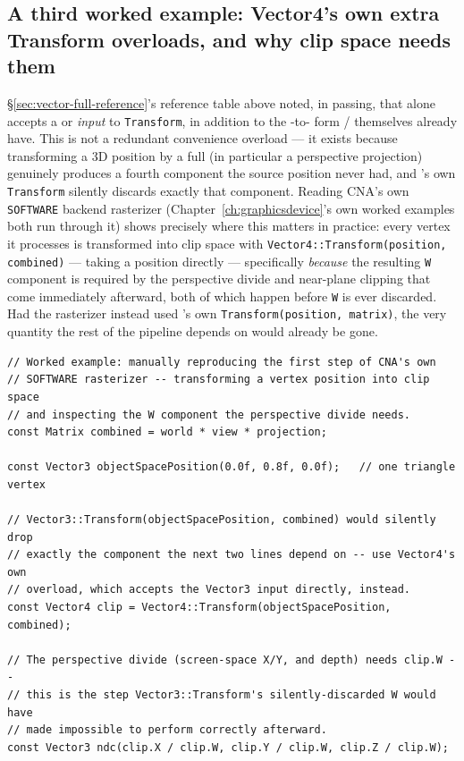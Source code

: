 \subsection{A third worked example: Vector4's own extra Transform overloads, and why clip space needs them}

\S\ref{sec:vector-full-reference}'s reference table above noted, in passing, that
 alone accepts a  or  \emph{input} to
\texttt{Transform}, in addition to the -to- form
 /  themselves already have. This is not a redundant
convenience overload --- it exists because transforming a 3D position by a full
 (in particular a perspective projection) genuinely produces a fourth
component the source position never had, and 's own \texttt{Transform}
silently discards exactly that component. Reading CNA's own \texttt{SOFTWARE} backend
rasterizer (Chapter~\ref{ch:graphicsdevice}'s own worked examples both run through it) shows
precisely where this matters in practice: every vertex it processes is transformed into clip
space with \texttt{Vector4::Transform(position, combined)} --- taking a 
position directly --- specifically \emph{because} the resulting \texttt{W} component is
required by the perspective divide and near-plane clipping that come immediately afterward,
both of which happen before \texttt{W} is ever discarded. Had the rasterizer instead used
's own \texttt{Transform(position, matrix)}, the very quantity the rest of
the pipeline depends on would already be gone.

\begin{lstlisting}
// Worked example: manually reproducing the first step of CNA's own
// SOFTWARE rasterizer -- transforming a vertex position into clip space
// and inspecting the W component the perspective divide needs.
const Matrix combined = world * view * projection;

const Vector3 objectSpacePosition(0.0f, 0.8f, 0.0f);   // one triangle vertex

// Vector3::Transform(objectSpacePosition, combined) would silently drop
// exactly the component the next two lines depend on -- use Vector4's own
// overload, which accepts the Vector3 input directly, instead.
const Vector4 clip = Vector4::Transform(objectSpacePosition, combined);

// The perspective divide (screen-space X/Y, and depth) needs clip.W --
// this is the step Vector3::Transform's silently-discarded W would have
// made impossible to perform correctly afterward.
const Vector3 ndc(clip.X / clip.W, clip.Y / clip.W, clip.Z / clip.W);
\end{lstlisting}

